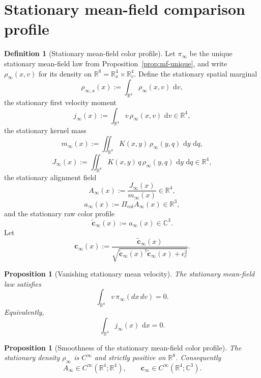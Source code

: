 \documentclass[11pt]{article}
\newtheorem{proposition}[theorem]{Proposition}
\theoremstyle{definition}
\newtheorem{definition}[theorem]{Definition}
\theoremstyle{remark}
\newcommand{\R}{\mathbb R}
\newcommand{\C}{\mathbb C}
\newcommand{\dd}{\,\mathrm d}
\begin{document}
\section{Stationary mean-field comparison profile}

\begin{definition}[Stationary mean-field color profile]
\label{def:stationary-mf-color}
Let \(\pi_\infty\) be the unique stationary mean-field law from
Proposition~\ref{prop:mf-unique}, and write \(\rho_\infty(x,v)\) for its
density on \(\R^8=\R_x^4\times\R_v^4\). Define the stationary spatial marginal
\[
\rho_{\infty,x}(x):=\int_{\R^4}\rho_\infty(x,v)\,\dd v,
\]
the stationary first velocity moment
\[
j_\infty(x):=\int_{\R^4}v\,\rho_\infty(x,v)\,\dd v\in\R^4,
\]
the stationary kernel mass
\[
m_\infty(x)
:=
\iint_{\R^8} K(x,y)\,\rho_\infty(y,q)\,\dd y\,\dd q,
\]
\[
J_\infty(x)
:=
\iint_{\R^8} K(x,y)\,q\,\rho_\infty(y,q)\,\dd y\,\dd q\in\R^4,
\]
the stationary alignment field
\[
A_\infty(x)
:=
\frac{J_\infty(x)}{m_\infty(x)}\in\R^4,
\]
\[
a_\infty(x):=\Pi_{\mathrm{col}}A_\infty(x)\in\R^3,
\]
and the stationary raw color profile
\[
\tilde{\mathbf c}_\infty(x):=a_\infty(x)\in\C^3.
\]
Let
\[
\mathbf c_\infty(x)
:=
\frac{\tilde{\mathbf c}_\infty(x)}
{\sqrt{\tilde{\mathbf c}_\infty(x)^\dagger\tilde{\mathbf c}_\infty(x)+\epsilon_c^2}}.
\]
\end{definition}

\begin{proposition}[Vanishing stationary mean velocity]
\label{prop:stationary-velocity-centering}
The stationary mean-field law satisfies
\[
\int_{\R^8} v\,\pi_\infty(dx\,dv)=0.
\]
Equivalently,
\[
\int_{\R^4} j_\infty(x)\,\dd x=0.
\]
\end{proposition}

\begin{proposition}[Smoothness of the stationary mean-field color profile]
\label{prop:stationary-mf-color-smooth}
The stationary density \(\rho_\infty\) is \(C^\infty\) and strictly positive on
\(\R^8\). Consequently
\[
A_\infty\in C^\infty(\R^4;\R^4),
\qquad
\mathbf c_\infty\in C^\infty(\R^4;\C^3).
\]
\end{proposition}
\end{document}
